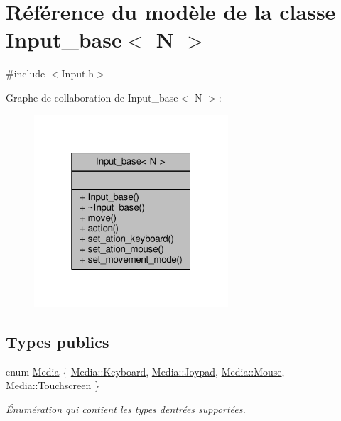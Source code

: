 \hypertarget{class_input__base}{}\section{Référence du modèle de la classe Input\+\_\+base$<$ N $>$}
\label{class_input__base}


{\ttfamily \#include $<$Input.\+h$>$}



Graphe de collaboration de Input\+\_\+base$<$ N $>$\+:\nopagebreak
\begin{figure}[H]
\begin{center}
\leavevmode
\includegraphics[width=205pt]{class_input__base__coll__graph}
\end{center}
\end{figure}
\subsection*{Types publics}
\begin{DoxyCompactItemize}
\item 
enum \hyperlink{class_input__base_a455585e7933485981b3d7bfcad3a47c6}{Media} \{ \hyperlink{class_input__base_a455585e7933485981b3d7bfcad3a47c6a6ce4d85a628a88bbdb3ac24a8e5a9c2e}{Media\+::\+Keyboard}, 
\hyperlink{class_input__base_a455585e7933485981b3d7bfcad3a47c6ad17c22e217179fc5626be9b94f1f18fa}{Media\+::\+Joypad}, 
\hyperlink{class_input__base_a455585e7933485981b3d7bfcad3a47c6af2a47c6809d88e175dade0ef7b16aa13}{Media\+::\+Mouse}, 
\hyperlink{class_input__base_a455585e7933485981b3d7bfcad3a47c6a588711541a203a16bbc517f3f73ef7c8}{Media\+::\+Touchscreen}
 \}\begin{DoxyCompactList}\small\item\em Énumération qui contient les types d\textquotesingle{}entrées supportées. \end{DoxyCompactList}
\end{DoxyCompactItemize}
